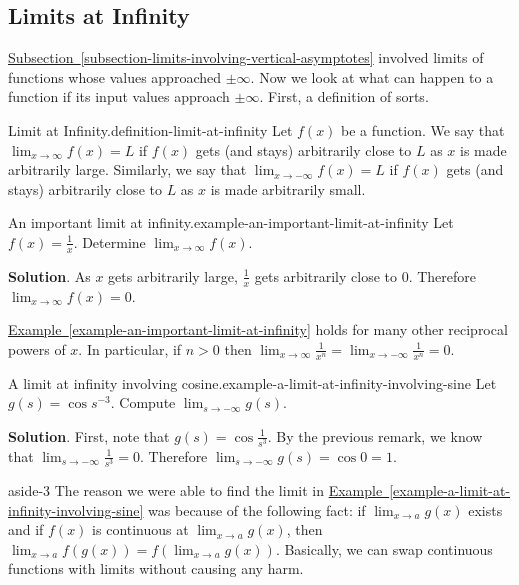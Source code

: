 \documentclass[10pt,]{book}
\numberwithin{equation}{section}
\begin{document}
\subsection[{Limits at Infinity}]{Limits at Infinity}\label{subsection-limits-at-infinity}
\hypertarget{p-59}{}%
\hyperref[subsection-limits-involving-vertical-asymptotes]{Subsection~\ref{subsection-limits-involving-vertical-asymptotes}} involved limits of functions whose values approached \(\pm\infty\). Now we look at what can happen to a function if its input values approach \(\pm\infty\). First, a definition of sorts.%
\begin{definition}{Limit at Infinity.}{definition-limit-at-infinity}%
\hypertarget{p-60}{}%
Let \(f(x)\) be a function. We say that \(\lim_{x\to\infty}f(x) = L\) if \(f(x)\) gets (and stays) arbitrarily close to \(L\) as \(x\) is made arbitrarily large. Similarly, we say that \(\lim_{x\to-\infty}f(x) = L\) if \(f(x)\) gets (and stays) arbitrarily close to \(L\) as \(x\) is made arbitrarily small.%
\end{definition}
\begin{example}{An important limit at infinity.}{example-an-important-limit-at-infinity}%
\hypertarget{p-61}{}%
Let \(f(x) = \frac{1}{x}\). Determine \(\lim_{x\to\infty}f(x)\).%
\par\smallskip%
\noindent\textbf{Solution}.\hypertarget{solution-12}{}\quad%
\hypertarget{p-62}{}%
As \(x\) gets arbitrarily large, \(\frac{1}{x}\) gets arbitrarily close to \(0\). Therefore \(\lim_{x\to\infty}f(x) = 0\).%
\end{example}
\hypertarget{p-63}{}%
\hyperref[example-an-important-limit-at-infinity]{Example~\ref{example-an-important-limit-at-infinity}} holds for many other reciprocal powers of \(x\). In particular, if \(n>0\) then \(\lim_{x\to\infty}\frac{1}{x^{n}} = \lim_{x\to-\infty}\frac{1}{x^{n}} = 0\).%
\begin{example}{A limit at infinity involving cosine.}{example-a-limit-at-infinity-involving-sine}%
\hypertarget{p-64}{}%
Let \(g(s) = \cos s^{-3}\). Compute \(\lim_{s\to-\infty}g(s)\).%
\par\smallskip%
\noindent\textbf{Solution}.\hypertarget{solution-13}{}\quad%
\hypertarget{p-65}{}%
First, note that \(g(s) = \cos\frac{1}{s^{3}}\). By the previous remark, we know that \(\lim_{s\to-\infty}\frac{1}{s^{3}} = 0\). Therefore \(\lim_{s\to-\infty}g(s) = \cos0 = 1\).%
\end{example}
\begin{aside}{}{aside-3}%
\hypertarget{p-66}{}%
The reason we were able to find the limit in \hyperref[example-a-limit-at-infinity-involving-sine]{Example~\ref{example-a-limit-at-infinity-involving-sine}} was because of the following fact: if \(\lim_{x\to a}g(x)\) exists and if \(f(x)\) is continuous at \(\lim_{x\to a}g(x)\), then \(\lim_{x\to a}f(g(x)) = f(\lim_{x\to a}g(x))\). Basically, we can swap continuous functions with limits without causing any harm.%
\end{aside}
\end{document}

